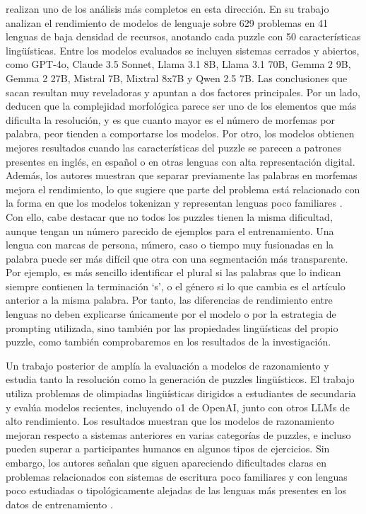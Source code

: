 \citet{choudhary2025unveiling} realizan uno de los análisis más completos en esta dirección. En su trabajo analizan el rendimiento de modelos de lenguaje sobre 629 problemas en 41 lenguas de baja densidad de recursos, anotando cada puzzle con 50 características lingüísticas. Entre los modelos evaluados se incluyen sistemas cerrados y abiertos, como GPT-4o, Claude 3.5 Sonnet, Llama 3.1 8B, Llama 3.1 70B, Gemma 2 9B, Gemma 2 27B, Mistral 7B, Mixtral 8x7B y Qwen 2.5 7B. Las conclusiones que sacan resultan muy reveladoras y apuntan a dos factores principales. Por un lado, deducen que la complejidad morfológica parece ser uno de los elementos que más dificulta la resolución, y es que cuanto mayor es el número de morfemas por palabra, peor tienden a comportarse los modelos. Por otro, los modelos obtienen mejores resultados cuando las características del puzzle se parecen a patrones presentes en inglés, en español o en otras lenguas con alta representación digital. Además, los autores muestran que separar previamente las palabras en morfemas mejora el rendimiento, lo que sugiere que parte del problema está relacionado con la forma en que los modelos tokenizan y representan lenguas poco familiares \citep{choudhary2025unveiling}. Con ello, cabe destacar que no todos los puzzles tienen la misma dificultad, aunque tengan un número parecido de ejemplos para el entrenamiento. Una lengua con marcas de persona, número, caso o tiempo muy fusionadas en la palabra puede ser más difícil que otra con una segmentación más transparente. Por ejemplo, es más sencillo identificar el plural si las palabras que lo indican siempre contienen la terminación `s', o el género si lo que cambia es el artículo anterior a la misma palabra. Por tanto, las diferencias de rendimiento entre lenguas no deben explicarse únicamente por el modelo o por la estrategia de prompting utilizada, sino también por las propiedades lingüísticas del propio puzzle, como también comprobaremos en los resultados de la investigación.

Un trabajo posterior de \citet{majmudar2025llms} amplía la evaluación a modelos de razonamiento y estudia tanto la resolución como la generación de puzzles lingüísticos. El trabajo utiliza problemas de olimpiadas lingüísticas dirigidos a estudiantes de secundaria y evalúa modelos recientes, incluyendo o1 de OpenAI, junto con otros LLMs de alto rendimiento. Los resultados muestran que los modelos de razonamiento mejoran respecto a sistemas anteriores en varias categorías de puzzles, e incluso pueden superar a participantes humanos en algunos tipos de ejercicios. Sin embargo, los autores señalan que siguen apareciendo dificultades claras en problemas relacionados con sistemas de escritura poco familiares y con lenguas poco estudiadas o tipológicamente alejadas de las lenguas más presentes en los datos de entrenamiento \citep{majmudar2025llms}.

